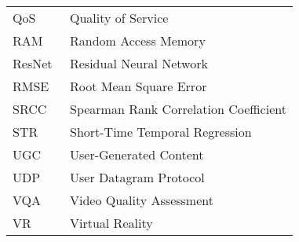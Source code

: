 \begin{flushleft}
\begin{tabular}{l p{0.8\linewidth}}
QoS & Quality of Service \\
RAM & Random Access Memory \\
ResNet & Residual Neural Network \\
RMSE & Root Mean Square Error \\
SRCC & Spearman Rank Correlation Coefficient \\
STR & Short-Time Temporal Regression \\
UGC & User-Generated Content \\
UDP & User Datagram Protocol \\
VQA & Video Quality Assessment \\
VR & Virtual Reality \\
\end{tabular}
\end{flushleft}
